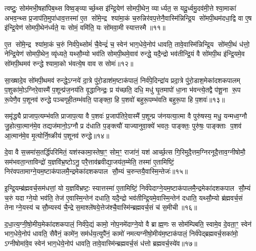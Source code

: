 त्वष्टुः॒ सोम॑मभी॒षहा॑पिब॒थ्स विष्व॒ङ्व्यार्च्छ॒थ्स इ॑न्द्रि॒येण॑ सोमपी॒थेन॒ व्यार्ध्यत॒ स यदू॒र्ध्वमु॒दव॑मी॒त्ते श्या॒माका॑ अभव॒न्थ्स प्र॒जाप॑ति॒मुपा॑धाव॒त्तस्मा॑ ए॒त सो॑मे॒न्द्र श्या॑मा॒कं च॒रुन्निर॑वप॒त्तेनै॒वास्मि॑न्निन्द्रि॒य सो॑मपी॒थम॑दधा॒द्वि वा ए॒ष इ॑न्द्रि॒येण॑ सोमपी॒थेन॑र्ध्यते॒ यः सोमं॒ वमि॑ति॒ यः सो॑मवा॒मी स्यात्तस्मै॥११॥

ए॒त सो॑मे॒न्द्र श्या॑मा॒कं च॒रुं निर्व॑पे॒थ्सोमं॑ चै॒वेन्द्रं॑ च॒ स्वेन॑ भाग॒धेये॒नोप॑ धावति॒ तावे॒वास्मि॑न्निन्द्रि॒य सो॑मपी॒थं ध॑त्तो॒ नेन्द्रि॒येण॑ सोमपी॒थेन॒ व्यृ॑ध्यते॒ यथ्सौ॒म्यो भव॑ति सोमपी॒थमे॒वाव॑ रुन्द्धे॒ यदै॒न्द्रो भव॑तीन्द्रि॒यं वै सो॑मपी॒थ इ॑न्द्रि॒यमे॒व सो॑मपी॒थमव॑ रुन्द्धे श्यामा॒को भ॑वत्ये॒ष वाव स सोमः॑॥१२॥

सा॒ख्षादे॒व सो॑मपी॒थमव॑ रुन्द्धे॒ऽग्नये॑ दा॒त्रे पु॑रो॒डाश॑म॒ष्टाक॑पालं॒ निर्व॑पे॒दिन्द्रा॑य प्रदा॒त्रे पु॑रो॒डाश॒मेका॑दशकपालम् प॒शुका॑मो॒ऽग्निरे॒वास्मै॑ प॒शून्प्र॑ज॒नय॑ति वृ॒द्धानिन्द्रः॒ प्र य॑च्छति॒ दधि॒ मधु॑ घृ॒तमापो॑ धा॒ना भ॑वन्त्ये॒तद्वै प॑शू॒ना रू॒प रू॒पेणै॒व प॒शूनव॑ रुन्द्धे पञ्चगृही॒तम्भ॑वति॒ पाङ्क्ता॒ हि प॒शवो॑ बहुरू॒पम्भ॑वति बहुरू॒पा हि प॒शवः॑॥१३॥

समृ॑द्ध्यै प्राजाप॒त्यम्भ॑वति प्राजाप॒त्या वै प॒शवः॑ प्र॒जाप॑तिरे॒वास्मै॑ प॒शून्प्र ज॑नयत्या॒त्मा वै पुरु॑षस्य॒ मधु॒ यन्मध्व॒ग्नौ जु॒होत्या॒त्मान॑मे॒व तद्यज॑मानो॒ऽग्नौ प्र द॑धाति प॒ङ्क्त्यौ॑ याज्यानुवा॒क्ये॑ भवतः॒ पाङ्क्तः॒ पुरु॑षः॒ पाङ्क्ताः प॒शव॑ आ॒त्मान॑मे॒व मृ॒त्योर्नि॒ष्क्रीय॑ प॒शूनव॑ रुन्द्धे॥१४॥

{\anuvakamend[{इ॒न्द्रि॒येऽस्मि॒न्भूम्या॑ ए॒तामिन्द्रः॒ स्यात्तस्मै॒ सोमो॑ बहुरू॒पा हि प॒शव॒ एक॑चत्वारिशच्च॥२॥}]}

दे॒वा वै स॒त्त्रमा॑स॒तर्द्धि॑परिमितं॒ यश॑स्कामा॒स्तेषा॒ꣳ॒ सोम॒ꣳ॒ राजा॑नं॒ यश॑ आर्च्छ॒त्स गि॒रिमुदै॒त्तम॒ग्निरनूदै॒त्ताव॒ग्नीषोमौ॒ सम॑भवता॒न्ताविन्द्रो॑ य॒ज्ञवि॑भ्र॒ष्टोऽनु॒ परै॒त्ताव॑ब्रवीद्या॒जय॑त॒म्मेति॒ तस्मा॑ ए॒तामिष्टिं॒ निर॑वपतामाग्ने॒यम॒ष्टाक॑पालमै॒न्द्रमेका॑दशकपाल सौ॒म्यं च॒रुन्तयै॒वास्मि॒न्तेजः॑॥१५॥

इ॒न्द्रि॒यम्ब्र॑ह्मवर्च॒सम॑धत्तां॒ यो य॒ज्ञवि॑भ्रष्टः॒ स्यात्तस्मा॑ ए॒तामिष्टिं॒ निर्व॑पेदाग्ने॒यम॒ष्टाक॑पालमै॒न्द्रमेका॑दशकपाल सौ॒म्यं च॒रुं यदाग्ने॒यो भव॑ति॒ तेज॑ ए॒वास्मि॒न्तेन॑ दधाति॒ यदै॒न्द्रो भव॑तीन्द्रि॒यमे॒वास्मि॒न्तेन॑ दधाति॒ यथ्सौ॒म्यो ब्र॑ह्मवर्च॒सं तेनाग्ने॒यस्य॑ च सौ॒म्यस्य॑ चै॒न्द्रे स॒माश्ले॑षये॒त्तेज॑श्चै॒वास्मि॑न्ब्रह्मवर्च॒सं च॑ स॒मीची॥१६॥

द॒धा॒त्य॒ग्नी॒षो॒मीय॒मेका॑दशकपालं॒ निर्व॑पे॒द्यं कामो॒ नोप॒नमे॑दाग्ने॒यो वै ब्राह्म॒णः स सोम॑म्पिबति॒ स्वामे॒व दे॒वता॒ꣳ॒ स्वेन॑ भाग॒धेये॒नोप॑ धावति॒ सैवैनं॒ कामे॑न॒ सम॑र्धय॒त्युपै॑नं॒ कामो॑ नमत्यग्नीषो॒मीय॑म॒ष्टाक॑पालं॒ निर्व॑पेद्ब्रह्मवर्च॒सका॑मो॒ ऽग्नीषोमा॑वे॒व स्वेन॑ भाग॒धेये॒नोप॑ धावति॒ तावे॒वास्मि॑न्ब्रह्मवर्च॒सं ध॑त्तो ब्रह्मवर्च॒स्ये॑व॥१७॥

